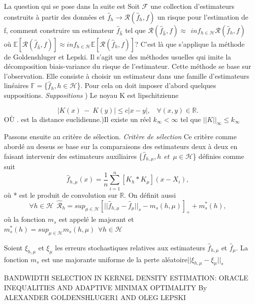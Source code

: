 \documentclass[
]{book}
\begin{document}
La question qui se pose dans la suite est \newline
Soit \(\mathcal{F}\) une collection d'estimateurs construits à partir des données et \(\hat{f}_h \rightarrow \mathcal{R}(\hat{f}_h,f)\) un risque pour l'estimation de f, comment construire un estimateur \(\hat{f}_{\hat h}\) tel que \(\mathcal{R}(\hat{f}_{\hat h},f) \approx~~inf_{h \in \mathcal{H}} \mathcal{R}(\hat{f}_h,f)\) où \(\mathbb{E}[\mathcal{R}(\hat{f}_{\hat{h}},f)] \approx inf_{h \in \mathcal {H}} \mathbb{E}[\mathcal{R}(\hat{f}_h,f)]\)?
C'est là que s'applique la méthode de Goldenshluger et Lepski. Il s'agit une des méthodes usuelles qui imite la décomposition biais-variance du risque de l'estimateur. \newline
Cette méthode se base sur l'observation. Elle consiste à choisir un estimateur dans une famille d'estimateurs linéaires \(\mathbb{F} =\)\{\(\hat{f}_h,h \in \mathcal{H}\)\}. Pour cela on doit imposer d'abord quelques suppositions. \newline
\emph{Suppositions} ) Le noyau K est lipschitzienne\newline

\[
|K(x)~-~K(y)| \leq c|x-y|,~~~~\forall(x,y)\in \mathbb{R}.
\]
OÙ \textbar.\textbar{} est la distance euclidienne.)Il existe un réel \(k_{\infty}<\infty\) tel que \(||K||_{\infty} \leq k_{\infty}\)

Passons ensuite au critère de sélection.\newline
\emph{Critère de sélection} \newline
Ce critère comme abordé au dessus se base sur la comparaisons des estimateurs deux à deux en faisant intervenir des estimateurs auxiliaires \{\(\hat f_{h,\mu},h~~ et~~ \mu \in \mathcal{H}\)\} définies comme suit
\[
\hat f_{h,\mu}(x)=\frac{1}{n}\sum^n_{i=1}[K_h * K_{\mu}](x-X_i),
\]
où * est le produit de convolution sur \(\mathbb{R}\).\newline
On définit aussi\newline
\[
\forall h \in \mathcal{H}~~\hat{\mathcal R}_h = sup_{\mu \in \mathcal{H}}[||\hat f_{h,\mu}-\hat f_\mu ||_s - m_s(h,\mu)]_+ + m^*_s(h),
\]
où la fonction \(m_s\) est appelé le majorant et \(m^*_s(h) = sup_{\mu \in \mathcal{H}}m_s(h,\mu) ~~ \forall h \in \mathcal{H}\)\newline

\begin{prop}
Soient $\xi_{h,\mu}$ et $\xi_\mu$ les erreurs stochastiques relatives aux estimateurs $\hat f_{h,\mu}$ et $\hat f_\mu$.\newline
La fonction $m_s$ est une majorante uniforme de la perte aléatoire$||\xi_{h,\mu}-\xi_\mu||_s$
\end{prop}
\begin{demo}
BANDWIDTH SELECTION IN KERNEL DENSITY ESTIMATION:
ORACLE INEQUALITIES AND ADAPTIVE MINIMAX
OPTIMALITY By ALEXANDER GOLDENSHLUGER1 AND OLEG LEPSKI
\end{demo}
\end{document}
